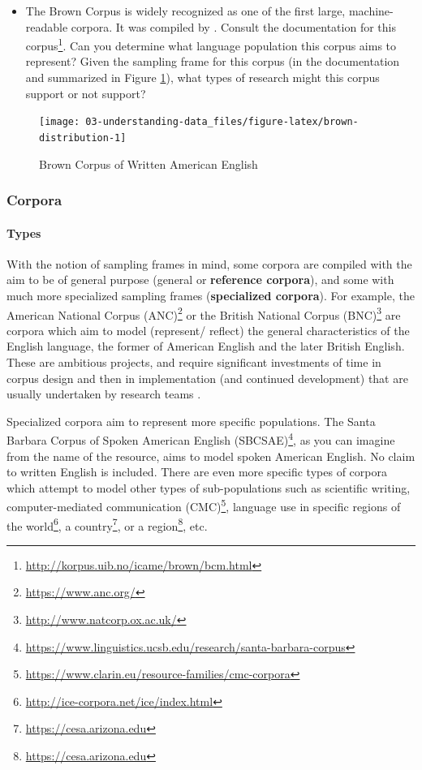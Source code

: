 \documentclass[
]{article}
\DeclareRobustCommand{\href}[2]{#2\footnote{\url{#1}}}
\newenvironment{rmdblock}[1]
  {\begin{shaded*}
  \begin{itemize}
  \renewcommand{\labelitemi}{
    \raisebox{-.5\height}[0pt][0pt]{
      {\setkeys{Gin}{width=2em,keepaspectratio}\texttt{[image: assets/images/\#1]}}
    }
  }
  \item
  }
  {
  \end{itemize}
  \end{shaded*}
  }
\newenvironment{rmdquestion}
  {\begin{rmdblock}{question}}
  {\end{rmdblock}}
\begin{document}
\begin{rmdquestion}
The Brown Corpus is widely recognized as one of the first large, machine-readable corpora. It was compiled by \citet{Kucera1967}. Consult the \href{http://korpus.uib.no/icame/brown/bcm.html}{documentation for this corpus}. Can you determine what language population this corpus aims to represent? Given the sampling frame for this corpus (in the documentation and summarized in Figure \ref{fig:brown-distribution}), what types of research might this corpus support or not support?
\end{rmdquestion}

\begin{figure}

{\centering \texttt{[image: 03-understanding-data\_files/figure-latex/brown-distribution-1]} 

}

\caption{Brown Corpus of Written American English}\label{fig:brown-distribution}
\end{figure}

\hypertarget{corpora}{%
\subsubsection{Corpora}\label{corpora}}

\hypertarget{types}{%
\paragraph{Types}\label{types}}

With the notion of sampling frames in mind, some corpora are compiled with the aim to be of general purpose (general or \textbf{reference corpora}), and some with much more specialized sampling frames (\textbf{specialized corpora}). For example, the \href{https://www.anc.org/}{American National Corpus (ANC)} or the \href{http://www.natcorp.ox.ac.uk/}{British National Corpus (BNC)} are corpora which aim to model (represent/ reflect) the general characteristics of the English language, the former of American English and the later British English. These are ambitious projects, and require significant investments of time in corpus design and then in implementation (and continued development) that are usually undertaken by research teams \citep{Adel2020}.

Specialized corpora aim to represent more specific populations. The \href{https://www.linguistics.ucsb.edu/research/santa-barbara-corpus}{Santa Barbara Corpus of Spoken American English (SBCSAE)}, as you can imagine from the name of the resource, aims to model spoken American English. No claim to written English is included. There are even more specific types of corpora which attempt to model other types of sub-populations such as scientific writing, \href{https://www.clarin.eu/resource-families/cmc-corpora}{computer-mediated communication (CMC)}, language use in specific \href{http://ice-corpora.net/ice/index.html}{regions of the world}, a \href{https://cesa.arizona.edu}{country}, or a \href{https://cesa.arizona.edu}{region}, etc.
\end{document}
